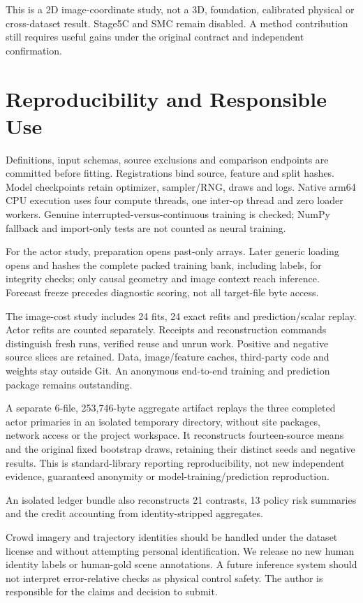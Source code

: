 \documentclass[10pt,twocolumn,letterpaper]{article}
\begin{document}
This is a 2D image-coordinate study, not a 3D, foundation, calibrated physical or cross-dataset result. Stage5C and SMC remain disabled. A method contribution still requires useful gains under the original contract and independent confirmation.


\section{Reproducibility and Responsible Use}

Definitions, input schemas, source exclusions and comparison endpoints are committed before fitting. Registrations bind source, feature and split hashes. Model checkpoints retain optimizer, sampler/RNG, draws and logs. Native arm64 CPU execution uses four compute threads, one inter-op thread and zero loader workers. Genuine interrupted-versus-continuous training is checked; NumPy fallback and import-only tests are not counted as neural training.


For the actor study, preparation opens past-only arrays. Later generic loading opens and hashes the complete packed training bank, including labels, for integrity checks; only causal geometry and image context reach inference. Forecast freeze precedes diagnostic scoring, not all target-file byte access.


The image-cost study includes 24 fits, 24 exact refits and prediction/scalar replay. Actor refits are counted separately. Receipts and reconstruction commands distinguish fresh runs, verified reuse and unrun work. Positive and negative source slices are retained. Data, image/feature caches, third-party code and weights stay outside Git. An anonymous end-to-end training and prediction package remains outstanding.


A separate 6-file, 253,746-byte aggregate artifact replays the three completed actor primaries in an isolated temporary directory, without site packages, network access or the project workspace. It reconstructs fourteen-source means and the original fixed bootstrap draws, retaining their distinct seeds and negative results. This is standard-library reporting reproducibility, not new independent evidence, guaranteed anonymity or model-training/prediction reproduction.


An isolated ledger bundle also reconstructs 21 contrasts, 13 policy risk summaries and the credit accounting from identity-stripped aggregates.


Crowd imagery and trajectory identities should be handled under the dataset license and without attempting personal identification. We release no new human identity labels or human-gold scene annotations. A future inference system should not interpret error-relative checks as physical control safety. The author is responsible for the claims and decision to submit.
\end{document}
